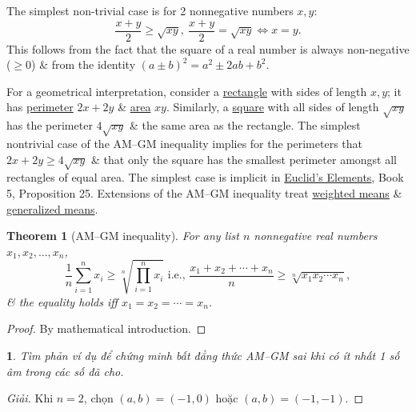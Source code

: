 \documentclass{article}
\newtheorem{baitoan}{}
\newtheorem{theorem}{Theorem}
\begin{document}
The simplest non-trivial case is for 2 nonnegative numbers $x,y$:
\begin{equation}
	\label{AM--GM inquality n = 2}
	\frac{x + y}{2}\ge\sqrt{xy},\ \frac{x + y}{2} = \sqrt{xy}\Leftrightarrow x = y.
\end{equation}
This follows from the fact that the square of a real number is always non-negative ($\ge0$) \& from the identity $(a\pm b)^2 = a^2\pm2ab + b^2$.

For a geometrical interpretation, consider a \href{https://en.wikipedia.org/wiki/Rectangle}{rectangle} with sides of length $x,y$; it has \href{https://en.wikipedia.org/wiki/Perimeter}{perimeter} $2x + 2y$ \& \href{https://en.wikipedia.org/wiki/Area}{area} $xy$. Similarly, a \href{https://en.wikipedia.org/wiki/Square}{square} with all sides of length $\sqrt{xy}$ has the perimeter $4\sqrt{xy}$ \& the same area as the rectangle. The simplest nontrivial case of the AM--GM inequality implies for the perimeters that $2x + 2y\ge4\sqrt{xy}$ \& that only the square has the smallest perimeter amongst all rectangles of equal area. The simplest case is implicit in \href{https://en.wikipedia.org/wiki/Euclid%27s_Elements}{Euclid's Elements}, Book 5, Proposition 25. Extensions of the AM--GM inequality treat \href{https://en.wikipedia.org/wiki/AM%E2%80%93GM_inequality#Weighted_AM.E2.80.93GM_inequality}{weighted means} \& \href{https://en.wikipedia.org/wiki/Generalized_mean}{generalized means}.

\begin{theorem}[AM--GM inequality]
	For any list $n$ nonnegative real numbers $x_1,x_2,\ldots,x_n$,
	\begin{equation}
		\label{AM--GM inequality}
		\frac{1}{n}\sum_{i=1}^n x_i\ge\sqrt[n]{\prod_{i=1}^n x_i}\mbox{ i.e., }\frac{x_1 + x_2 + \cdots + x_n}{n}\ge\sqrt[n]{x_1x_2\cdots x_n},
	\end{equation}
	\& the equality holds iff $x_1 = x_2 = \cdots = x_n$.
\end{theorem}

\begin{proof}
	By mathematical introduction.
\end{proof}

\begin{baitoan}
	Tìm phản ví dụ để chứng minh bất đẳng thức AM--GM sai khi có ít nhất 1 số âm trong các số đã cho.
\end{baitoan}

\begin{proof}[Giải]
	Khi $n = 2$, chọn $(a,b) = (-1,0)$ hoặc $(a,b) = (-1,-1)$.
\end{proof}
\end{document}
